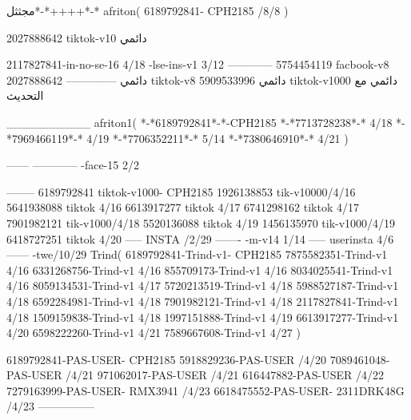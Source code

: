 مجثثل*-*++++*-*
afriton(
6189792841- CPH2185  /8/8
)

2027888642 tiktok-v10
دائمي

2117827841-in-no-se-16 4/18
-lse-ins-v1 3/12
------------
5754454119 facbook-v8
دائمي
--------------
2027888642 tiktok-v8
دائمي
5909533996 tiktok-v1000
دائمي مع التحديث

__________
afriton1(
*-*6189792841*-*-CPH2185
*-*7713728238*-* 4/18
*-*7969466119*-* 4/19
*-*7706352211*-* 5/14
*-*7380646910*-* 4/21
)


------
------------
-face-15 2/2

--------
6189792841 tiktok-v1000- CPH2185 
1926138853 tik-v10000/4/16
5641938088 tiktok 4/16
6613917277 tiktok 4/17
6741298162 tiktok 4/17
7901982121 tik-v1000/4/18
5520136088 tiktok 4/19
1456135970 tik-v1000/4/19
6418727251 tiktok 4/20
-----
 INSTA /2/29
-------
-m-v14 1/14
-----
userinsta 4/6
------
-twe/10/29
Trind(
6189792841-Trind-v1- CPH2185 
7875582351-Trind-v1  4/16
6331268756-Trind-v1  4/16
855709173-Trind-v1  4/16
8034025541-Trind-v1  4/16
8059134531-Trind-v1  4/17
5720213519-Trind-v1  4/18
5988527187-Trind-v1  4/18
6592284981-Trind-v1  4/18
7901982121-Trind-v1  4/18
2117827841-Trind-v1  4/18
1509159838-Trind-v1  4/18
1997151888-Trind-v1  4/19
6613917277-Trind-v1  4/20
6598222260-Trind-v1  4/21
7589667608-Trind-v1  4/27
)

6189792841-PAS-USER- CPH2185 
5918829236-PAS-USER /4/20
7089461048-PAS-USER /4/21
971062017-PAS-USER /4/21
616447882-PAS-USER /4/22
7279163999-PAS-USER- RMX3941 /4/23
6618475552-PAS-USER- 2311DRK48G /4/23
    ---------------

